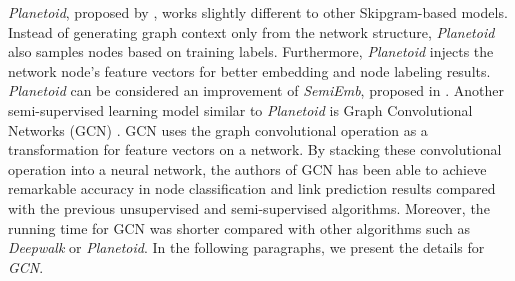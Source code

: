 \documentclass{article}
\theoremstyle{definition}
\begin{document}
\emph{Planetoid}, proposed by \cite{planetoid}, works slightly different to
other Skipgram-based models. Instead of generating graph context only from the
network structure, \emph{Planetoid} also samples nodes based on training labels.
Furthermore, \emph{Planetoid} injects the network node's feature vectors for better
embedding and node labeling results. \emph{Planetoid} can be considered an
improvement of \emph{SemiEmb}, proposed in \cite{weston2012deep}. Another semi-supervised
learning model similar to \emph{Planetoid} is Graph Convolutional
Networks (GCN) \cite{gcn}. GCN uses the graph convolutional operation as a
transformation for feature vectors on a network. By stacking these convolutional
operation into a neural network, the authors of GCN has been able to achieve
remarkable accuracy in node classification and link prediction results
compared with the previous unsupervised and semi-supervised algorithms.
Moreover, the running time for GCN was shorter compared with other algorithms
such as \emph{Deepwalk} or \emph{Planetoid}. In the following paragraphs, we
present the details for \emph{GCN}.
\end{document}
